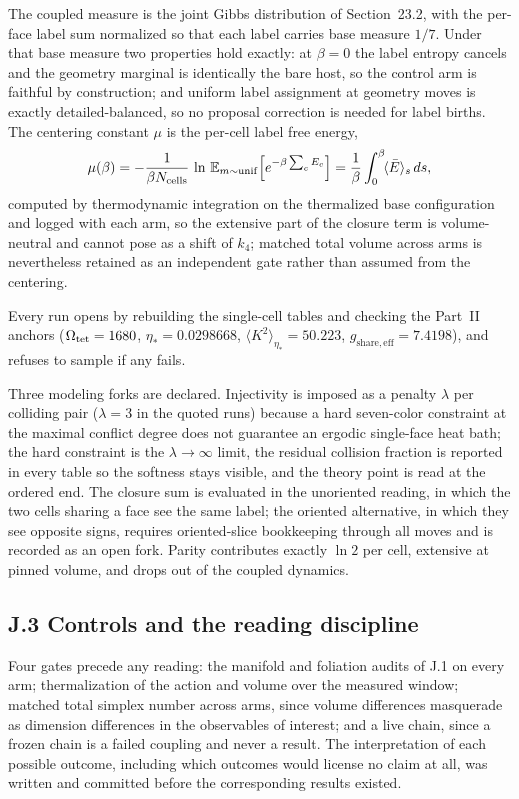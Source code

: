 \documentclass[11pt]{article}
\begin{document}
The coupled measure is the joint Gibbs distribution of Section~23.2, with the per-face label sum normalized so that each label carries base measure $1/7$. Under that base measure two properties hold exactly: at $\beta=0$ the label entropy cancels and the geometry marginal is identically the bare host, so the control arm is faithful by construction; and uniform label assignment at geometry moves is exactly detailed-balanced, so no proposal correction is needed for label births. The centering constant $\mu$ is the per-cell label free energy,
\[
\mu(\beta)=-\frac{1}{\beta N_{\rm cells}}\,\ln\,\mathbb{E}_{m\sim{\rm unif}}\!\left[e^{-\beta\sum_c E_c}\right]
=\frac{1}{\beta}\int_0^\beta\!\langle \bar E\rangle_s\,ds,
\]
computed by thermodynamic integration on the thermalized base configuration and logged with each arm, so the extensive part of the closure term is volume-neutral and cannot pose as a shift of $k_4$; matched total volume across arms is nevertheless retained as an independent gate rather than assumed from the centering.

Every run opens by rebuilding the single-cell tables and checking the Part~II anchors ($\Omega_{\rm tet}=1680$, $\eta_*=0.0298668$, $\langle K^2\rangle_{\eta_*}=50.223$, $g_{\mathrm{share,eff}}=7.4198$), and refuses to sample if any fails.

Three modeling forks are declared. Injectivity is imposed as a penalty $\lambda$ per colliding pair ($\lambda=3$ in the quoted runs) because a hard seven-color constraint at the maximal conflict degree does not guarantee an ergodic single-face heat bath; the hard constraint is the $\lambda\to\infty$ limit, the residual collision fraction is reported in every table so the softness stays visible, and the theory point is read at the ordered end. The closure sum is evaluated in the unoriented reading, in which the two cells sharing a face see the same label; the oriented alternative, in which they see opposite signs, requires oriented-slice bookkeeping through all moves and is recorded as an open fork. Parity contributes exactly $\ln 2$ per cell, extensive at pinned volume, and drops out of the coupled dynamics.

\subsection*{J.3 Controls and the reading discipline}

Four gates precede any reading: the manifold and foliation audits of J.1 on every arm; thermalization of the action and volume over the measured window; matched total simplex number across arms, since volume differences masquerade as dimension differences in the observables of interest; and a live chain, since a frozen chain is a failed coupling and never a result. The interpretation of each possible outcome, including which outcomes would license no claim at all, was written and committed before the corresponding results existed.
\end{document}
